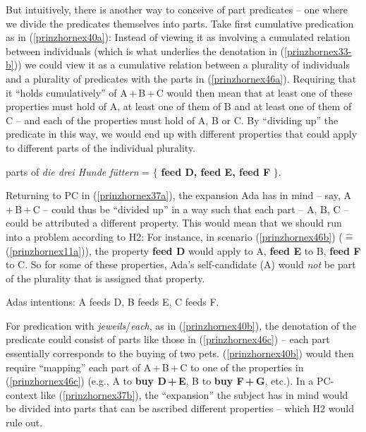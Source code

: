 \documentclass[output=paper,colorlinks,citecolor=brown,
]{langscibook}
\begin{document}
\ea  \label{prinzhornpc}
	\z\z

But intuitively, there is another way  to conceive of part predicates -- one where we divide the predicates themselves into parts. Take first cumulative predication as in (\ref{prinzhornex40a}): Instead of viewing it as involving a cumulated relation between individuals (which is what underlies the denotation in (\ref{prinzhornex33-b})) we could view it as a cumulative relation between a plurality of individuals and a plurality of predicates with the parts in  (\ref{prinzhornex46a}). Requiring that it “holds cumulatively” of A\,+\,B\,+\,C would then mean that at least one of these properties must hold of {A}, at least one of them  of {B} and at least one of them of {C} -- and each of the properties must hold of {A}, {B} or {C}. By “dividing up” the predicate in this way, we would  end up with different properties that could apply to different parts of the individual plurality.

\ea  parts of \textit{die drei Hunde füttern} = $\{$ \textbf{feed D, feed E, feed F} $\}$.\label{prinzhornex46a}
\z

Returning to PC in (\ref{prinzhornex37a}), the expansion Ada has in mind -- say, A\,+\,B\,+\,C -- could thus be “divided up” in a way such that each part -- {A}, {B}, {C} -- could be attributed a different property. This would mean that we should run into a problem according to H2: For instance, in scenario (\ref{prinzhornex46b}) ($\widehat{=}$ (\ref{prinzhornex11a})), the property {\bf feed D} would apply to {A},  {\bf feed E} to {B}, \textbf{feed F} to {C}. So for some of these properties, Ada's self-candidate ({A}) would \textit{not}  be part of the plurality that is assigned that property.

 Adas intentions: A feeds D, B feeds E, C feeds F. \label{prinzhornex46b} \z

For predication with \textit{jeweils}\slash\textit{each}, as in (\ref{prinzhornex40b}), the denotation of  the predicate could consist of parts like those in (\ref{prinzhornex46c}) -- each part essentially corresponds to the buying of two pets. (\ref{prinzhornex40b}) would then require “mapping” each part of A\,+\,B\,+\,C to one of the properties in (\ref{prinzhornex46c}) (e.g., {A} to \textbf{buy D\,+\,E}, {B} to \textbf{buy F\,+\,G}, etc.). In a PC-context like (\ref{prinzhornex37b}),  the “expansion” the subject has in mind would be divided into parts that can be ascribed different properties -- which H2 would rule out.
\end{document}
